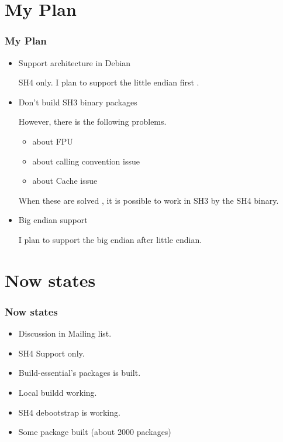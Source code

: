 \documentclass[cjk,dvipdfmx,12pt]{beamer}
\begin{document}
\section{My Plan}
\begin{frame}
 \frametitle{My Plan}
 \begin{itemize}
  \item Support architecture in Debian
    
	SH4 only. 
	I plan to support the little endian first .

  \item Don't build SH3 binary packages

	However, there is the following problems. 
	\begin{itemize}
	  \item about FPU
	  \item about calling convention issue
	  \item about Cache issue
	\end{itemize}

	When these are solved , it is possible to 
	work in SH3 by the SH4 binary. 
	
	

  \item Big endian support

	I plan to support the big endian after little endian.
  
 \end{itemize}
\end{frame}

\section{Now states}

\begin{frame}
 \frametitle{Now states}
 \begin{itemize}
  \item Discussion in Mailing list.
  \item SH4 Support only.
  \item Build-essential's packages is built.
  \item Local buildd working.
  \item SH4 debootstrap is working.
  \item Some package built (about 2000 packages)
 \end{itemize}
\end{frame}
\end{document}
